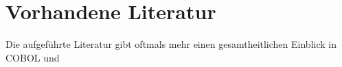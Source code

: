 \section{Vorhandene Literatur}
Die aufgeführte Literatur gibt oftmals mehr einen gesamtheitlichen Einblick in COBOL und 